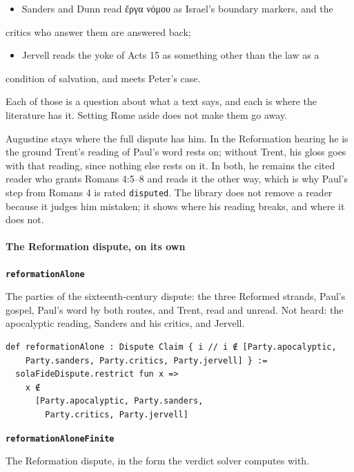 \documentclass[11pt]{article}
\begin{document}
\begin{itemize}
  \item Sanders and Dunn read ἔργα νόμου as Israel's boundary markers, and the
\end{itemize}
  critics who answer them are answered back;

\begin{itemize}
  \item Jervell reads the yoke of Acts 15 as something other than the law as a
\end{itemize}
  condition of salvation, and meets Peter's case.

Each of those is a question about what a text says, and each is where the literature has it. Setting Rome aside does not make them go away.

Augustine stays where the full dispute has him. In the Reformation hearing he is the ground Trent's reading of Paul's word rests on; without Trent, his gloss goes with that reading, since nothing else rests on it. In both, he remains the cited reader who grants Romans 4:5–8 and reads it the other way, which is why Paul's step from Romans 4 is rated \texttt{disputed}. The library does not remove a reader because it judges him mistaken; it shows where his reading breaks, and where it does not.

\paragraph*{The Reformation dispute, on its own}
\leavevmode\par
\par\medskip\noindent\textbf{\texttt{reformation\allowbreak{}Alone}}\par\nobreak\noindent
The parties of the sixteenth-century dispute: the three Reformed strands, Paul's gospel, Paul's word by both routes, and Trent, read and unread. Not heard: the apocalyptic reading, Sanders and his critics, and Jervell.

{\small\begin{verbatim}
def reformationAlone : Dispute Claim { i // i ∉ [Party.apocalyptic,
    Party.sanders, Party.critics, Party.jervell] } :=
  solaFideDispute.restrict fun x =>
    x ∉
      [Party.apocalyptic, Party.sanders,
        Party.critics, Party.jervell]
\end{verbatim}}
\par\medskip\noindent\textbf{\texttt{reformation\allowbreak{}Alone\allowbreak{}Finite}}\par\nobreak\noindent
The Reformation dispute, in the form the verdict solver computes with.
\end{document}
